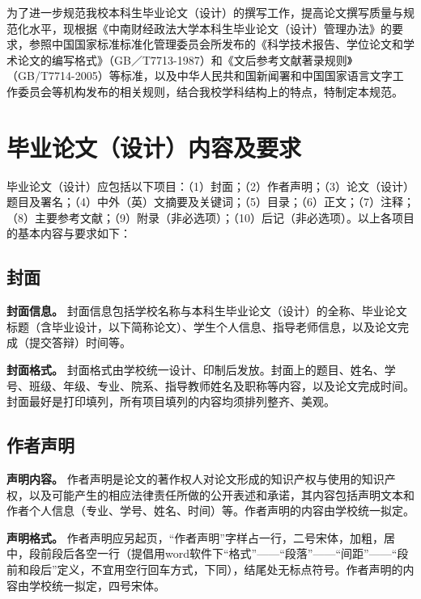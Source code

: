 \documentclass[doublesided]{Style/ucasthesis}%
\begin{document}
\raggedbottom

为了进一步规范我校本科生毕业论文（设计）的撰写工作，提高论文撰写质量与规范化水平，现根据《中南财经政法大学本科生毕业论文（设计）管理办法》的要求，参照中国国家标准标准化管理委员会所发布的《科学技术报告、学位论文和学术论文的编写格式》（GB／T7713-1987）和《文后参考文献著录规则》（GB/T7714-2005）等标准，以及中华人民共和国新闻署和中国国家语言文字工作委员会等机构发布的相关规则，结合我校学科结构上的特点，特制定本规范。

\hypertarget{section-10}{%
\section{毕业论文（设计）内容及要求}\label{section-10}}

毕业论文（设计）应包括以下项目：（1）封面；（2）作者声明；（3）论文（设计）题目及署名；（4）中外（英）文摘要及关键词；（5）目录；（6）正文；（7）注释；（8）主要参考文献；（9）附录（非必选项）；（10）后记（非必选项）。以上各项目的基本内容与要求如下：

\hypertarget{section-11}{%
\subsection{封面}\label{section-11}}

\textbf{封面信息。} 封面信息包括学校名称与本科生毕业论文（设计）的全称、毕业论文标题（含毕业设计，以下简称论文）、学生个人信息、指导老师信息，以及论文完成（提交答辩）时间等。

\textbf{封面格式。} 封面格式由学校统一设计、印制后发放。封面上的题目、姓名、学号、班级、年级、专业、院系、指导教师姓名及职称等内容，以及论文完成时间。封面最好是打印填列，所有项目填列的内容均须排列整齐、美观。

\hypertarget{section-12}{%
\subsection{作者声明}\label{section-12}}

\textbf{声明内容。} 作者声明是论文的著作权人对论文形成的知识产权与使用的知识产权，以及可能产生的相应法律责任所做的公开表述和承诺，其内容包括声明文本和作者个人信息（专业、学号、姓名、时间）等。作者声明的内容由学校统一拟定。

\textbf{声明格式。} 作者声明应另起页，``作者声明''字样占一行，二号宋体，加粗，居中，段前段后各空一行（提倡用word软件下``格式''------``段落''------``间距''------``段前和段后''定义，不宜用空行回车方式，下同），结尾处无标点符号。作者声明的内容由学校统一拟定，四号宋体。
\end{document}
